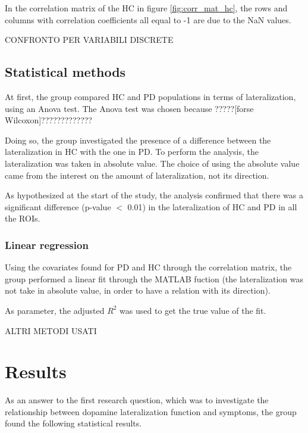 \documentclass[]{article}
\begin{document}
\begin{multicols}{2}

In the correlation matrix of the HC in figure \ref{fig:corr_mat_hc}, the rows and columns with correlation coefficients all equal to -1 are due to the NaN values.

CONFRONTO PER VARIABILI DISCRETE

\subsection{Statistical methods}

At first, the group compared HC and PD populations in terms of lateralization, using an Anova test. The Anova test was chosen because ?????[forse Wilcoxon]?????????????

Doing so, the group investigated the presence of a difference between the lateralization in HC with the one in PD. To perform the analysis, the lateralization was taken in absolute value. The choice of using the absolute value came from the interest on the amount of lateralization, not its direction.

As hypothesized at the start of the study, the analysis confirmed that there was a significant difference (p-value $<$ 0.01) in the lateralization of HC and PD in all the ROIs. 

\subsubsection{Linear regression}

Using the covariates found for PD and HC through the correlation matrix, the group performed a linear fit through the MATLAB fuction  (the lateralization was not take in absolute value, in order to have a relation with its direction).

As parameter, the adjusted $R^2$ was used to get the true value of the fit.

ALTRI METODI USATI

\section{Results}

As an answer to the first research question, which was to investigate the relationship between dopamine lateralization function and symptoms, the group found the following statistical results. 

\end{multicols}
\end{document}
